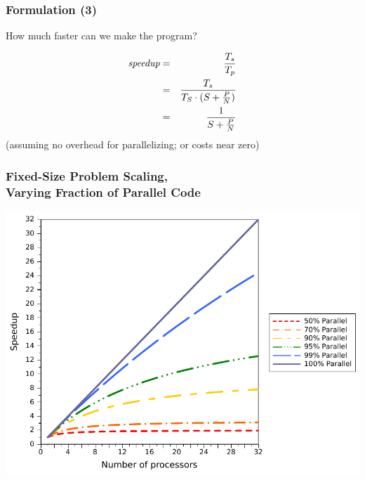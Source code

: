 \documentclass[aspectratio=43]{beamer}
\begin{document}
\begin{frame}
  \frametitle{Formulation (3)}

  \hspace*{3em} How much faster can we make the program?

  \begin{eqnarray*}
  \mbox{\em speedup} &=& \frac{T_s}{T_p}\\
                     &=& \frac{T_s}{T_S \cdot (S + \frac{P}{N})}\\
                     &=& \frac{1}{S + \frac{P}{N}}
  \end{eqnarray*}
  \vfill
  \hspace*{3em} (assuming no overhead for parallelizing; or costs near
  zero)

\end{frame}

\begin{frame}
  \frametitle{Fixed-Size Problem Scaling, \\ Varying Fraction of Parallel Code}

  \begin{center}
    \hspace*{2em}\includegraphics[scale=0.68]{L02/parallel-scaling}
  \end{center}
\end{frame}
\end{document}
